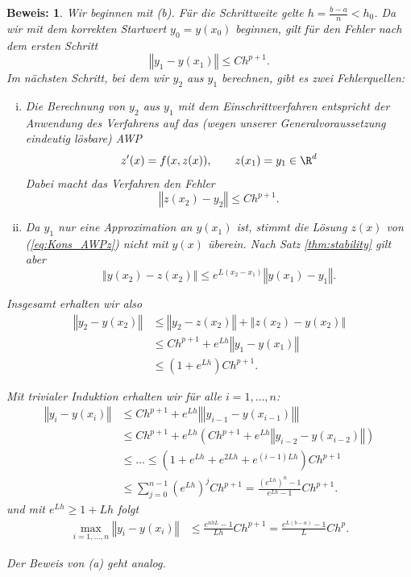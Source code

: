 \documentclass[
]{mycourse}
\theoremstyle{mythm}
\theoremstyle{break}
\newtheorem*{beweis}{Beweis:}
\newcommand{\norm}[1]{\left\Vert#1\right\Vert}		%
\newcommand{\labeq}[1]{\label{eq:#1}}			%
\newcommand{\req}[1]{(\ref{eq:#1})}
\begin{document}
\begin{beweis}
Wir beginnen mit (b). Für die Schrittweite gelte $h=\frac{b-a}{n}<h_0$.
Da wir mit dem korrekten Startwert $y_0=y(x_0)$ beginnen, gilt für den Fehler nach dem ersten Schritt
\[
\norm{y_1-y(x_1)}\leq C h^{p+1}.
\]
Im nächsten Schritt, bei dem wir $y_2$ aus $y_1$ berechnen, gibt es zwei Fehlerquellen:
\begin{enumerate}[(i)]
\item Die Berechnung von $y_2$ aus $y_1$ mit dem Einschrittverfahren entspricht der Anwendung des 
Verfahrens auf das (wegen unserer Generalvoraussetzung eindeutig lösbare) AWP 
\begin{align}\labeq{Kons_AWPz}
z'(x)=f(x,z(x)), \qquad z(x_1)=y_1\in \R^d
\end{align}
Dabei macht das Verfahren den Fehler
\[
\norm{z(x_2)-y_2}\leq C h^{p+1}.
\]

\item Da $y_1$ nur eine Approximation an $y(x_1)$ ist, stimmt die Lösung $z(x)$ von \req{Kons_AWPz}
nicht mit $y(x)$ überein. Nach Satz \ref{thm:stability} gilt aber
\[
\norm{y(x_2)-z(x_2)} \leq e^{L (x_2-x_1)} \norm{y(x_1)-y_1}.
\]
\end{enumerate}

Insgesamt erhalten wir also
\begin{align*}
\norm{y_2-y(x_2)} &\leq \norm{y_2-z(x_2)} + \norm{z(x_2)-y(x_2)}\\
&\leq  C h^{p+1} + e^{Lh} \norm{y_1-y(x_1)}\\
&\leq  (1 + e^{Lh}) C h^{p+1}.
\end{align*}

Mit trivialer Induktion erhalten wir für alle $i=1,\ldots,n$:
\begin{align*}
\norm{y_i-y(x_i)} &\leq C h^{p+1} + e^{Lh} \norm{|y_{i-1}-y(x_{i-1})|} \\
&\leq C h^{p+1} + e^{Lh} \left( C h^{p+1} + e^{Lh} \norm{y_{i-2}-y(x_{i-2})} \right)  \\
&\leq \ldots \leq  \left( 1+ e^{Lh} + e^{2Lh} + e^{(i-1) Lh} \right) C h^{p+1}\\
& \leq \sum_{j=0}^{n-1} \left(e^{Lh}\right)^{j}  C h^{p+1}
= \frac{(e^{Lh})^n-1}{e^{Lh}-1} C h^{p+1}.
\end{align*}
und mit $e^{Lh}\geq 1+Lh$ folgt 
\begin{align*}
\max_{i=1,\ldots,n} \norm{y_i-y(x_i)}&\leq  \frac{e^{nhL}-1}{Lh} C h^{p+1}= \frac{e^{L(b-a)}-1}{L} C h^{p}.
\end{align*}

Der Beweis von (a) geht analog.
\end{beweis}
\end{document}
